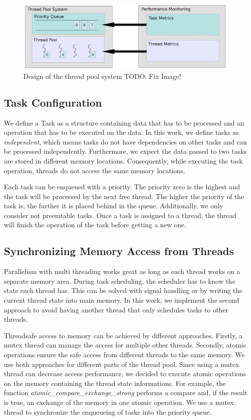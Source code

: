 \documentclass[conference]{IEEEtran}
\begin{document}
\begin{figure}[htbp]
	\includegraphics[width=1.0\textwidth]{img/pool_structure.png}
	\caption{Design of the thread pool system TODO: Fix Image!}
	\label{fig0}
\end{figure}

\subsection{Task Configuration}
We define a Task as a structure containing data that has to be processed and an operation that has to be executed on the data. In this work, we define tasks as \emph{independent}, which means tasks do not have dependencies on other tasks and can be processed independently. Furthermore, we expect the data passed to two tasks are stored in different memory locations. Consequently, while executing the task operation, threads do not access the same memory locations. 

Each task can be enqueued with a priority. The priority zero is the highest and the task will be processed by the next free thread. The higher the priority of the task is, the further it is placed behind in the queue. Additionally, we only consider not preemtable tasks. Once a task is assigned to a thread, the thread will finish the operation of the task before getting a new one. 

\subsection{Synchronizing Memory Access from Threads}
Parallelism with multi threading works great as long as each thread works on a separate memory area. During task scheduling, the scheduler has to know the state each thread has. This can be solved with signal handling or by writing the current thread state into main memory. In this work, we implement the second approach to avoid having another thread that only schedules tasks to other threads. 

Threadsafe access to memory can be achieved by different approaches. Firstly, a mutex thread can manage the access for multiple other threads. Secondly, atomic operations ensure the safe access from different threads to the same memory. We use both approaches for different parts of the thread pool. Since using a mutex thread can decrease access performance, we decided to execute atomic operations on the memory containing the thread state informations. For example, the function \emph{atomic\_compare\_exchange\_strong} performs a compare and, if the result is true, an exchange of the memory in one atomic operation. We use a mutex thread to synchronize the enqueueing of tasks into the priority queue.
\end{document}
